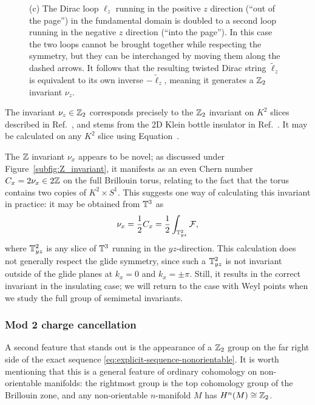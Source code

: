 \begin{figure}[htb!]
{		(c) The Dirac loop $\ell_z$ running in the positive $z$ direction (``out of the page'') in the fundamental domain is doubled to a second loop running in the negative $z$ direction (``into the page''). In this case the two loops cannot be brought together while respecting the symmetry, but they can be interchanged by moving them along the dashed arrows. It follows that the resulting twisted Dirac string $\tilde{\ell}_z$ is equivalent to its own inverse $-\tilde{\ell}_z$, meaning it generates a $\mathbb{Z}_2$ invariant $\nu_z$.} %
	\label{fig:K2S1_invariants}
\end{figure}

The invariant $\nu_z\in\mathbb{Z}_2$ corresponds precisely to the $\mathbb{Z}_2$ invariant on $K^2$ slices described in Ref.~\cite{Fonseca-Vaidya_nonorientable}, and stems from the 2D Klein bottle insulator in Ref.~\cite{CYZ_Klein-gauge}. It may be calculated on any $K^2$ slice using Equation~. %

The $\mathbb{Z}$ invariant $\nu_x$ appears to be novel; as discussed under Figure~\ref{subfig:Z_invariant}, it manifests as an even Chern number $C_x = 2\nu_x\in 2\mathbb{Z}$ on the full Brillouin torus, relating to the fact that the torus contains two copies of $K^2\times S^1$. This suggests one way of calculating this invariant in practice: it may be obtained from $\mathbb{T}^3$ as
\begin{equation}\label{eq:z-invariant1}
	\nu_x = \frac{1}{2}C_x = \frac{1}{2}\int_{\mathbb{T}_{yz}^2}\mathcal{F},
\end{equation}
where $\mathbb{T}_{yz}^2$ is any slice of $\mathbb{T}^3$ running in the $yz$-direction. This calculation does not generally respect the glide symmetry, since such a $\mathbb{T}_{yz}^2$ is not invariant outside of the glide planes at $k_x=0$ and $k_x = \pm\pi$. Still, it results in the correct invariant in the insulating case; we will return to the case with Weyl points when we study the full group of semimetal invariants.

\subsubsection{Mod 2 charge cancellation}

A second feature that stands out is the appearance of a $\mathbb{Z}_2$ group on the far right side of the exact sequence \eqref{eq:explicit-sequence-nonorientable}. It is worth mentioning that this is a general feature of ordinary cohomology on non-orientable manifolds: the rightmost group is the top cohomology group of the Brillouin zone, and any non-orientable $n$-manifold $M$ has $H^n(M)\cong\mathbb{Z}_2$.

